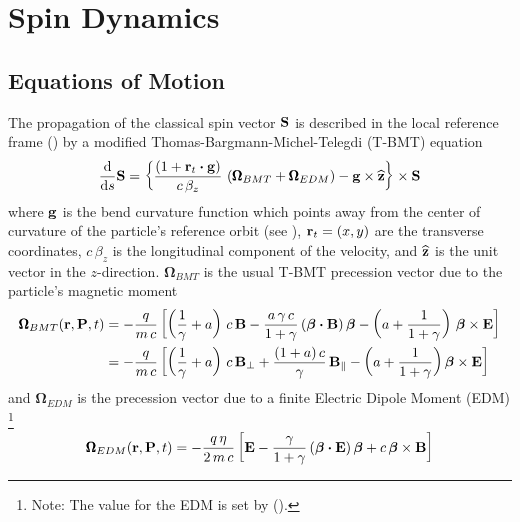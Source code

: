 \chapter{Spin Dynamics}
\label{c:spin}

\section{Equations of Motion}
\label{s:spin.dyn}

The propagation of the classical spin vector ${\bf S}$ is described in the local reference
frame () by a modified Thomas-Bargmann-Michel-Telegdi
(T-BMT) equation\cite{b:spin.hoff}
\begin{equation}
  \frac{\mathrm{d}}{\mathrm{d}s} {\bf S} = 
  \left\{ \frac{(1+{\bf r}_t \mathbin{\boldsymbol{\cdot}} {\bf g})}{c \, \beta_z} \, 
  \left( {\pmb\Omega}_{BMT} + {\pmb\Omega}_{EDM} \right) - 
  {\bf g} \times {\widehat{\bf z}} \right\} \times \mathbf{S}
  \label{tbmt}
\end{equation}
where ${\bf g}$ is the bend curvature function which points away from the center of curvature
of the particle's reference orbit (see ), ${\bf r}_t = (x, y)$ are the
transverse coordinates, $c \, \beta_z$ is the longitudinal component of the velocity, and
${\widehat{\bf z}}$ is the unit vector in the $z$-direction. $\pmb\Omega_{BMT}$ is the usual T-BMT
precession vector due to the particle's magnetic moment
\begin{align}
  {\pmb\Omega}_{BMT} (\mathbf{r,P},t) &= 
    - \frac{q}{m \, c} \left[ 
    \left(\frac{1}{\gamma} + a \right) \, c \, {\bf B} -
    \frac{a \, \gamma \, c}{1 + \gamma} \, ( \boldsymbol{\beta} \mathbin{\boldsymbol{\cdot}} {\bf B} ) \, \boldsymbol{\beta} -
    \left( a + \frac{1}{1 + \gamma} \right) \, \mathbf{\boldsymbol{\beta} \times  E} 
    \right] \label{orpt} \\
  &= - \frac{q}{m \, c} \left[ 
    \left( \frac{1}{\gamma} + a \right) \, c \, {\bf B}_{\perp} +
    \frac{(1 + a) \, c}{\gamma} \, {\bf B}_\parallel -
    \left( a + \frac{1}{1 + \gamma} \right) \mathbf{\boldsymbol{\beta} \times E} 
    \right] \nonumber
\end{align}
and $\pmb\Omega_{EDM}$ is the
precession vector due to a finite Electric Dipole Moment (EDM) \cite{b:silenko}\footnote
  {
Note: The value for the EDM is set by  ().
  }
\begin{equation}
  {\pmb\Omega}_{EDM} (\mathbf{r,P},t) = 
  - \frac{q \, \eta}{2 \, m \, c} \left[
  {\bf E} - \frac{\gamma}{1 + \gamma} \, 
  ( \boldsymbol{\beta} \mathbin{\boldsymbol{\cdot}} {\bf E} ) \, \boldsymbol{\beta} +
  c \, \mathbf{\boldsymbol{\beta} \times B}
  \right]
\end{equation}
